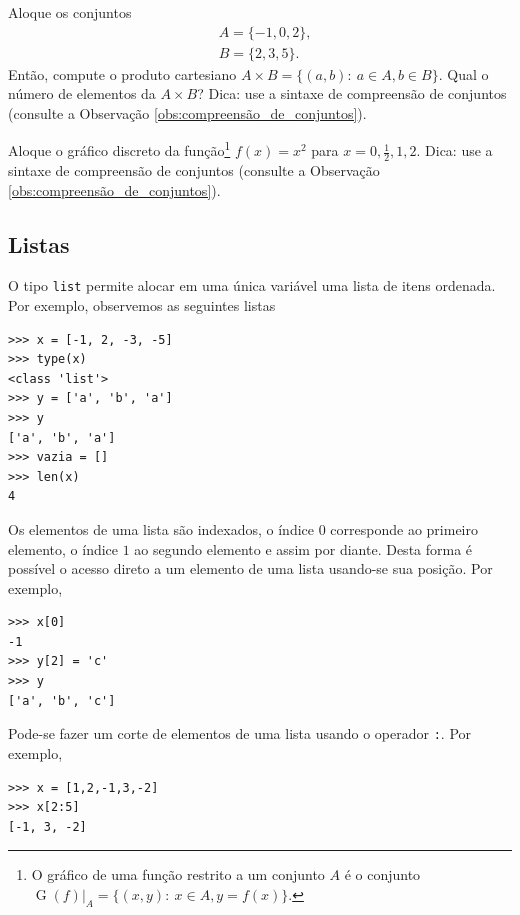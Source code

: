 \documentclass[12pt]{article}
\begin{document}
\begin{exr}
  Aloque os conjuntos
  \begin{align}
    &A = \{-1, 0, 2\},\\
    &B = \{2, 3, 5\}.
  \end{align}
  Então, compute o produto cartesiano $A\times B=\{(a,b):~a\in A, b\in B\}$. Qual o número de elementos da $A\times B$? Dica: use a sintaxe de compreensão de conjuntos (consulte a Observação \ref{obs:compreensão_de_conjuntos}).
\end{exr}

\begin{exr}
  Aloque o gráfico discreto da função\footnote{O gráfico de uma função restrito a um conjunto $A$ é o conjunto $\operatorname{G}(f)|_{A} = \{(x,y):~x\in A, y=f(x)\}$.} $f(x) = x^2$ para $x=0, \frac{1}{2}, 1, 2$. Dica: use a sintaxe de compreensão de conjuntos (consulte a Observação \ref{obs:compreensão_de_conjuntos}).
\end{exr}

\subsection{Listas}

O tipo {\python} \lstinline+list+ permite alocar em uma única variável uma lista de itens ordenada. Por exemplo, observemos as seguintes listas

\begin{lstlisting}
>>> x = [-1, 2, -3, -5]
>>> type(x)
<class 'list'>
>>> y = ['a', 'b', 'a']
>>> y
['a', 'b', 'a']
>>> vazia = []
>>> len(x)
4
\end{lstlisting}

Os elementos de uma lista são indexados, o índice $0$ corresponde ao primeiro elemento, o índice $1$ ao segundo elemento e assim por diante. Desta forma é possível o acesso direto a um elemento de uma lista usando-se sua posição. Por exemplo,

\begin{lstlisting}
>>> x[0]
-1
>>> y[2] = 'c'
>>> y
['a', 'b', 'c']
\end{lstlisting}

Pode-se fazer um corte de elementos de uma lista usando o operador \lstinline+:+. Por exemplo,

\begin{lstlisting}
>>> x = [1,2,-1,3,-2]
>>> x[2:5]
[-1, 3, -2]
\end{lstlisting}
\end{document}
